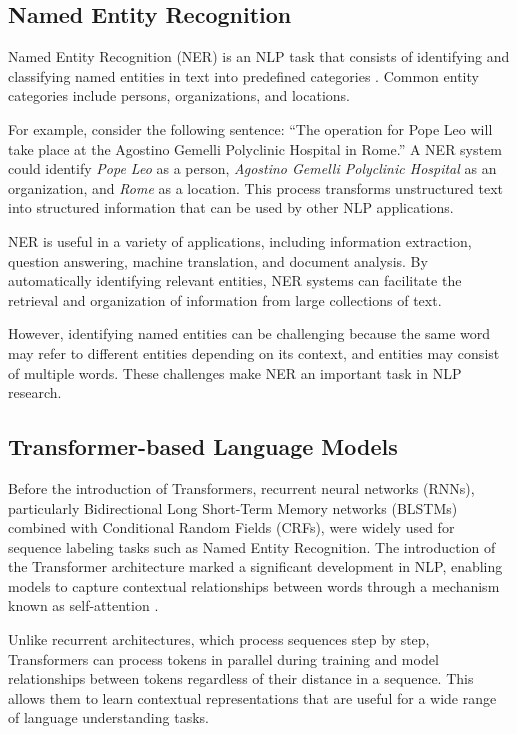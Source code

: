 \subsection{Named Entity Recognition}
\label{subsec:ner}

Named Entity Recognition (NER) is an NLP task that consists of identifying and classifying named entities in text into predefined categories \cite{mohit2014ner}. Common entity categories include persons, organizations, and locations.

For example, consider the following sentence: ``The operation for Pope Leo will take place at the Agostino Gemelli Polyclinic Hospital in Rome.'' A NER system could identify \textit{Pope Leo} as a person, \textit{Agostino Gemelli Polyclinic Hospital} as an organization, and \textit{Rome} as a location. This process transforms unstructured text into structured information that can be used by other NLP applications.

NER is useful in a variety of applications, including information extraction, question answering, machine translation, and document analysis. By automatically identifying relevant entities, NER systems can facilitate the retrieval and organization of information from large collections of text.

However, identifying named entities can be challenging because the same word may refer to different entities depending on its context, and entities may consist of multiple words. These challenges make NER an important task in NLP research.

\subsection{Transformer-based Language Models}
\label{subsec:transformer}

Before the introduction of Transformers, recurrent neural networks (RNNs), particularly Bidirectional Long Short-Term Memory networks (BLSTMs) combined with Conditional Random Fields (CRFs), were widely used for sequence labeling tasks such as Named Entity Recognition. The introduction of the Transformer architecture marked a significant development in NLP, enabling models to capture contextual relationships between words through a mechanism known as self-attention \cite{vaswani2017attention}.

Unlike recurrent architectures, which process sequences step by step, Transformers can process tokens in parallel during training and model relationships between tokens regardless of their distance in a sequence. This allows them to learn contextual representations that are useful for a wide range of language understanding tasks.

